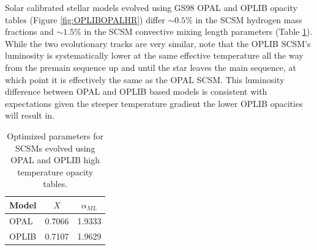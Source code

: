 Solar calibrated stellar models evolved using GS98 OPAL and OPLIB opacity
tables (Figure \ref{fig:OPLIBOPALHR}) differ $\sim 0.5\%$ in the SCSM hydrogen
mass fractions and $\sim 1.5\%$ in the SCSM convective mixing length parameters
(Table \ref{tab:SCSMResults}). While the two evolutionary tracks are very
similar, note that the OPLIB SCSM's luminosity is systematically lower at the
same effective temperature all the way from the premain sequence up and until
the star leaves the main sequence, at which point it is effectively the same as
the OPAL SCSM. This luminosity difference between OPAL and OPLIB based models
is consistent with expectations given the steeper temperature gradient the
lower OPLIB opacities will result in.

\begin{table}
	\centering
	\begin{tabular}{l c c}
		\hline
		Model & $X$ & $\alpha_{ML}$ \\
		\hline
		\hline
		OPAL & 0.7066 & 1.9333 \\
		OPLIB & 0.7107 & 1.9629
	\end{tabular}
	\caption{Optimized parameters for SCSMs evolved using OPAL and OPLIB high
	temperature opacity tables.}
	\label{tab:SCSMResults}
\end{table}
